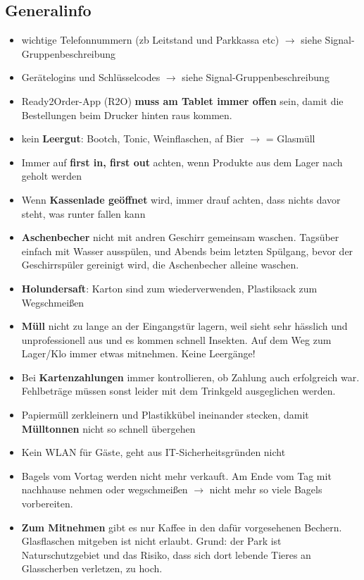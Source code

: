 \documentclass[a4paper,12pt]{article}
\newcounter{row}
\begin{document}
{
  \hypersetup{linkcolor=black}
  \tableofcontents
}
\clearpage

\subsection{Generalinfo}
\begin{itemize}
    \item wichtige Telefonnummern (zb Leitstand und Parkkassa etc) $\longrightarrow$ siehe Signal-Gruppenbeschreibung
    \item Gerätelogins und Schlüsselcodes $\longrightarrow$ siehe Signal-Gruppenbeschreibung
    \item Ready2Order-App (R2O) \textbf{muss am Tablet immer offen} sein, damit die Bestellungen beim Drucker hinten raus kommen.
    \item kein \textbf{Leergut}: Bootch, Tonic, Weinflaschen, af Bier $\rightarrow$ = Glasmüll
    \item Immer auf \textbf{first in, first out} achten, wenn Produkte aus dem Lager nach geholt werden
    \item Wenn \textbf{Kassenlade geöffnet} wird, immer drauf achten, dass nichts davor steht, was runter fallen kann
    \item \textbf{Aschenbecher} nicht mit andren Geschirr gemeinsam waschen. Tagsüber einfach mit Wasser ausspülen, und Abends beim letzten Spülgang, bevor der Geschirrspüler gereinigt wird, die Aschenbecher alleine waschen.
    \item \textbf{Holundersaft}: Karton sind zum wiederverwenden, Plastiksack zum Wegschmeißen
    \item \textbf{Müll} nicht zu lange an der Eingangstür lagern, weil sieht sehr hässlich und unprofessionell aus und es kommen schnell Insekten. Auf dem Weg zum Lager/Klo immer etwas mitnehmen. Keine Leergänge!
    \item Bei \textbf{Kartenzahlungen} immer kontrollieren, ob Zahlung auch erfolgreich war. Fehlbeträge müssen sonst leider mit dem Trinkgeld ausgeglichen werden.
    \item Papiermüll zerkleinern und Plastikkübel ineinander stecken, damit \textbf{Mülltonnen} nicht so schnell übergehen
    \item Kein WLAN für Gäste, geht aus IT-Sicherheitsgründen nicht
    \item Bagels vom Vortag werden nicht mehr verkauft. Am Ende vom Tag mit nachhause nehmen oder wegschmeißen $\rightarrow$ nicht mehr so viele Bagels vorbereiten.
    \item \textbf{Zum Mitnehmen} gibt es nur Kaffee in den dafür vorgesehenen Bechern. Glasflaschen mitgeben ist nicht erlaubt. Grund: der Park ist Naturschutzgebiet und das Risiko, dass sich dort lebende Tieres an Glasscherben verletzen, zu hoch.
\end{itemize}
\end{document}
